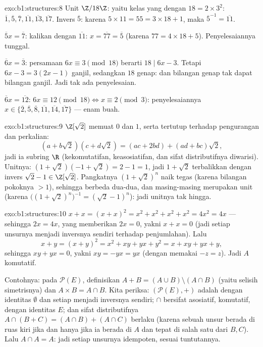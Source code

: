 \begin{solution}{exo:b1:structures:8}
Unit $\Z/18\Z$: yaitu kelas yang  dengan $18 = 2 \times 3^2$:
$\overline 1, \overline 5, \overline 7, \overline{11}, \overline{13},
\overline{17}$. Invers $\overline 5$: karena $5 \times 11 = 55 = 3\times
18 + 1$, maka $\overline 5^{-1} = \overline{11}$.

$\overline 5 x = \overline 7$: kalikan dengan $\overline{11}$: $x =
\overline{77} = \overline 5$ (karena $77 = 4\times 18 + 5$). Penyelesaiannya
tunggal.

$\overline 6 x = \overline 3$: persamaan $6x \equiv 3 \pmod{18}$
berarti $18 \mid 6x - 3$. Tetapi $6x - 3 = 3(2x - 1)$ ganjil, sedangkan $18$
genap: dan bilangan genap tak dapat  bilangan ganjil. Jadi tak ada penyelesaian.

$\overline 6 x = \overline{12}$: $6x \equiv 12 \pmod{18} \iff x
\equiv 2 \pmod 3$: penyelesaiannya $x \in \{\overline 2, \overline 5,
\overline 8, \overline{11}, \overline{14}, \overline{17}\}$ --- enam
buah.
\end{solution}

\begin{solution}{exo:b1:structures:9}
 $\Z[\sqrt 2]$ memuat $0$ dan $1$, serta tertutup terhadap pengurangan
dan perkalian:
\[
(a + b\sqrt 2)(c + d\sqrt 2) = (ac + 2bd) + (ad + bc)\sqrt 2 ,
\]
jadi ia subring $\R$ (kekomutatifan, keasosiatifan, dan
sifat distributifnya diwarisi). Unitnya: $(1 + \sqrt 2)(-1 + \sqrt 2) =
2 - 1 = 1$, jadi $1 + \sqrt 2$ terbalikkan dengan invers $\sqrt 2 - 1
\in \Z[\sqrt 2]$. Pangkatnya $(1 + \sqrt 2)^n$ naik tegas
(karena bilangan pokoknya $> 1$), sehingga berbeda dua-dua, dan masing-masing
merupakan unit (karena $\bigl((1+\sqrt2)^n\bigr)^{-1} = (\sqrt 2 - 1)^n$): jadi 
unitnya tak hingga.
\end{solution}

\begin{solution}{exo:b1:structures:10}
$x + x = (x + x)^2 = x^2 + x^2 + x^2 + x^2 = 4x^2 = 4x$ --- sehingga $2x =
4x$, yang memberikan $2x = 0$, yakni $x + x = 0$ (jadi setiap unsurnya menjadi
inversnya sendiri terhadap penjumlahan). Lalu
\[
x + y = (x+y)^2 = x^2 + xy + yx + y^2 = x + xy + yx + y ,
\]
sehingga $xy + yx = 0$, yakni $xy = -yx = yx$ (dengan memakai $-z = z$). Jadi $A$
komutatif.

Contohnya: pada $\mathcal{P}(E)$, definisikan $A + B = (A \cup B) \setminus (A
\cap B)$ (yaitu selisih simetrisnya) dan $A \times B = A \cap B$. Kita
periksa: $(\mathcal{P}(E), +)$ adalah  dengan identitas
$\emptyset$ dan setiap  menjadi inversnya sendiri; $\cap$ bersifat asosiatif,
komutatif, dengan identitas $E$; dan sifat distributifnya $A \cap (B + C) = (A
\cap B) + (A \cap C)$ berlaku (karena sebuah unsur berada di ruas kiri jika dan hanya jika ia
berada di $A$ dan tepat di salah satu dari $B, C$). Lalu $A \cap A = A$: jadi setiap
unsurnya idempoten, sesuai tuntutannya.
\end{solution}

